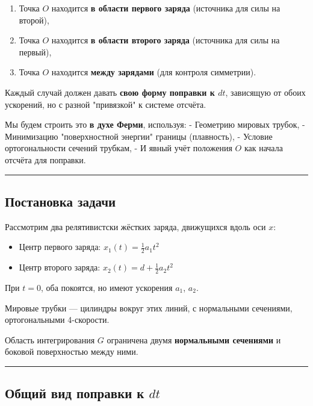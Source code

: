 \documentclass[11pt]{article}
\providecommand{\tightlist}{%
      \setlength{\itemsep}{0pt}\setlength{\parskip}{0pt}}
\begin{document}
\begin{enumerate}
\def\labelenumi{\arabic{enumi}.}
\tightlist
\item
  Точка \(O\) находится \textbf{в области первого заряда} (источника для
  силы на второй),
\item
  Точка \(O\) находится \textbf{в области второго заряда} (источника для
  силы на первый),
\item
  Точка \(O\) находится \textbf{между зарядами} (для контроля
  симметрии).
\end{enumerate}

Каждый случай должен давать \textbf{свою форму поправки к \(dt\)},
зависящую от обоих ускорений, но с разной "привязкой" к системе отсчёта.

Мы будем строить это \textbf{в духе Ферми}, используя: - Геометрию
мировых трубок, - Минимизацию "поверхностной энергии" границы
(плавность), - Условие ортогональности сечений трубкам, - И явный учёт
положения \(O\) как начала отсчёта для поправки.

\begin{center}\rule{0.5\linewidth}{\linethickness}\end{center}

\subsection{ Постановка задачи}

Рассмотрим два релятивистски жёстких заряда, движущихся вдоль оси \(x\):

\begin{itemize}
\tightlist
\item
  Центр первого заряда: \(x_1(t) = \frac{1}{2} a_1 t^2\)
\item
  Центр второго заряда: \(x_2(t) = d + \frac{1}{2} a_2 t^2\)
\end{itemize}

При \(t = 0\), оба покоятся, но имеют ускорения \(a_1\), \(a_2\).

Мировые трубки --- цилиндры вокруг этих линий, с нормальными сечениями,
ортогональными 4-скорости.

Область интегрирования \(G\) ограничена двумя \textbf{нормальными
сечениями} и боковой поверхностью между ними.

\begin{center}\rule{0.5\linewidth}{\linethickness}\end{center}

\subsection{\texorpdfstring{ Общий вид поправки к \(dt\)}{ Общий вид поправки к dt}}
\end{document}
